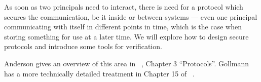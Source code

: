 As soon as two principals need to interact, there is need for a protocol which 
secures the communication, be it inside or between systems --- even one 
principal communicating with itself in different points in time, which is the 
case when storing something for use at a later time.
We will explore how to design secure protocols and introduce some tools for 
verification.

Anderson gives an overview of this area in 
~\cite{Anderson2008sea}, Chapter 
3 \enquote{Protocols}.
Gollmann has a more technically detailed treatment in Chapter 15 of 
~\cite{Gollmann2011cs}.

